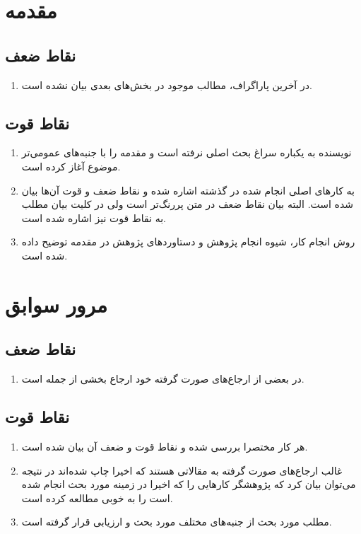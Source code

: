 \documentclass[14pt,a4]{article}
\begin{document}
\section{مقدمه}

\subsection{نقاط ضعف}

\begin{enumerate}
    \item در آخرین پاراگراف، مطالب موجود در بخش‌های بعدی بیان نشده است.
\end{enumerate}

\subsection{نقاط قوت}

\begin{enumerate}
    \item نویسنده به یکباره سراغ بحث اصلی نرفته است و مقدمه را با جنبه‌های عمومی‌تر موضوع آغاز کرده است.
    \item به کار‌های اصلی انجام شده در گذشته اشاره شده و نقاط ضعف و قوت آن‌ها بیان شده است. البته
    بیان نقاط ضعف در متن پررنگ‌تر است ولی در کلیت بیان مطلب به نقاط قوت نیز اشاره شده است.
    \item روش انجام کار، شیوه انجام پژوهش و دستاورد‌های پژوهش در مقدمه توضیح داده شده است.
\end{enumerate}

\section{مرور سوابق}

\subsection{نقاط ضعف}

\begin{enumerate}
    \item در بعضی از ارجاع‌های صورت گرفته خود ارجاع بخشی از جمله است.
\end{enumerate}

\subsection{نقاط قوت}

\begin{enumerate}
    \item هر کار مختصرا بررسی شده و نقاط قوت و ضعف آن بیان شده است.
    \item غالب ارجاع‌های صورت گرفته به مقالاتی هستند که اخیرا چاپ شده‌اند در نتیجه
    می‌توان بیان کرد که پژوهشگر کار‌هایی را که اخیرا در زمینه مورد بحث انجام شده است را به خوبی
    مطالعه کرده است.
    \item مطلب مورد بحث از جنبه‌های مختلف مورد بحث و ارزیابی قرار گرفته است.
\end{enumerate}
\end{document}
